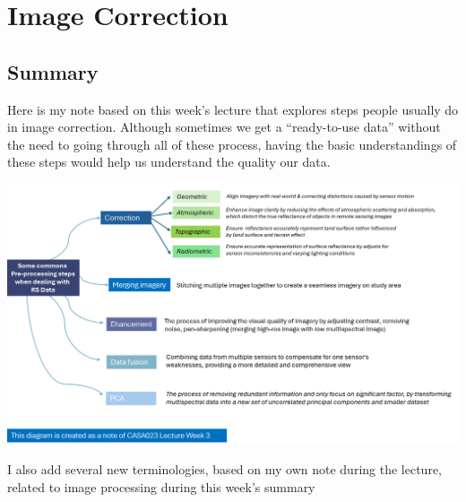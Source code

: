 \documentclass[
  letterpaper,
  DIV=11,
  numbers=noendperiod]{scrreprt}
\begin{document}

\hypertarget{image-correction}{%
\chapter{Image Correction}\label{image-correction}}

\hypertarget{summary-2}{%
\section{Summary}\label{summary-2}}

Here is my note based on this week's lecture that explores steps people
usually do in image correction. Although sometimes we get a
``ready-to-use data'' without the need to going through all of these
process, having the basic understandings of these steps would help us
understand the quality our data.

\includegraphics{images/clipboard-3039716080.png}

I also add several new terminologies, based on my own note during the
lecture, related to image processing during this week's summary
\end{document}
